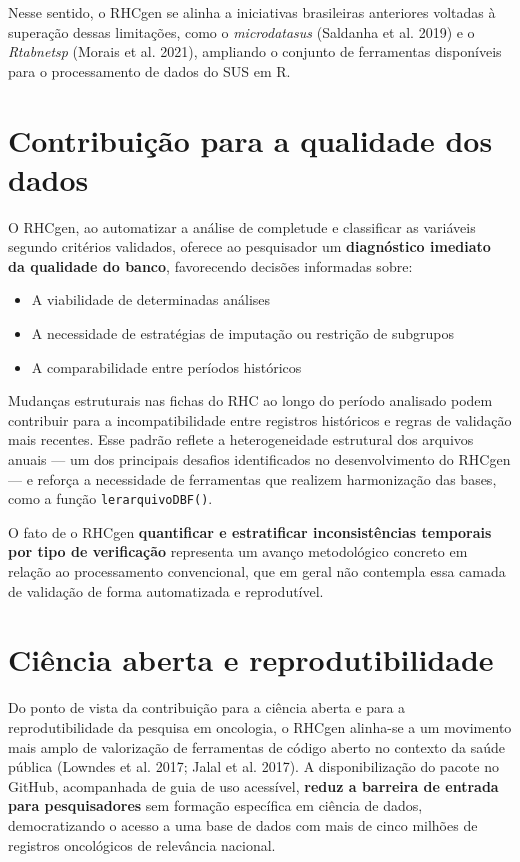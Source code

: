 \documentclass[
  brazilian,
  a4paper,
  oneside]{scrbook}
\providecommand{\tightlist}{%
  \setlength{\itemsep}{0pt}\setlength{\parskip}{0pt}}
\begin{document}
Nesse sentido, o RHCgen se alinha a iniciativas brasileiras anteriores
voltadas à superação dessas limitações, como o \emph{microdatasus}
(Saldanha et al. 2019) e o \emph{Rtabnetsp} (Morais et al. 2021),
ampliando o conjunto de ferramentas disponíveis para o processamento de
dados do SUS em R.

\section{Contribuição para a qualidade dos
dados}\label{contribuiuxe7uxe3o-para-a-qualidade-dos-dados}

O RHCgen, ao automatizar a análise de completude e classificar as
variáveis segundo critérios validados, oferece ao pesquisador um
\textbf{diagnóstico imediato da qualidade do banco}, favorecendo
decisões informadas sobre:

\begin{itemize}
\tightlist
\item
  A viabilidade de determinadas análises
\item
  A necessidade de estratégias de imputação ou restrição de subgrupos
\item
  A comparabilidade entre períodos históricos
\end{itemize}

Mudanças estruturais nas fichas do RHC ao longo do período analisado
podem contribuir para a incompatibilidade entre registros históricos e
regras de validação mais recentes. Esse padrão reflete a heterogeneidade
estrutural dos arquivos anuais --- um dos principais desafios
identificados no desenvolvimento do RHCgen --- e reforça a necessidade
de ferramentas que realizem harmonização das bases, como a função
\texttt{lerarquivoDBF()}.

O fato de o RHCgen \textbf{quantificar e estratificar inconsistências
temporais por tipo de verificação} representa um avanço metodológico
concreto em relação ao processamento convencional, que em geral não
contempla essa camada de validação de forma automatizada e reprodutível.

\section{Ciência aberta e
reprodutibilidade}\label{ciuxeancia-aberta-e-reprodutibilidade}

Do ponto de vista da contribuição para a ciência aberta e para a
reprodutibilidade da pesquisa em oncologia, o RHCgen alinha-se a um
movimento mais amplo de valorização de ferramentas de código aberto no
contexto da saúde pública ({Lowndes et al.} 2017; Jalal et al. 2017). A
disponibilização do pacote no GitHub, acompanhada de guia de uso
acessível, \textbf{reduz a barreira de entrada para pesquisadores} sem
formação específica em ciência de dados, democratizando o acesso a uma
base de dados com mais de cinco milhões de registros oncológicos de
relevância nacional.
\end{document}
